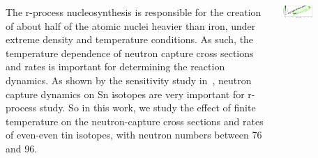 \documentclass[25pt, a0paper, portrait]{tikzposter}
\begin{document}
\begin{columns}

    {The r-process nucleosynthesis is responsible for the creation of about half of
    the atomic nuclei heavier than iron, under extreme density and temperature
    conditions. As such, the temperature dependence of neutron capture cross
    sections and rates is important for determining the reaction dynamics. As shown
    by the sensitivity study in~\cite{Mumpower2016}, neutron capture dynamics
    on Sn isotopes are very important for r-process study.  So in this work, we
    study the effect of finite temperature on the neutron-capture cross sections and
    rates of even-even tin isotopes, with neutron numbers between 76 and 96.
	\begin{tikzfigure}
	    \includegraphics[width=0.4\textwidth]{images/mumpower.pdf}
	\end{tikzfigure}
   }

\end{columns}
\end{document}
